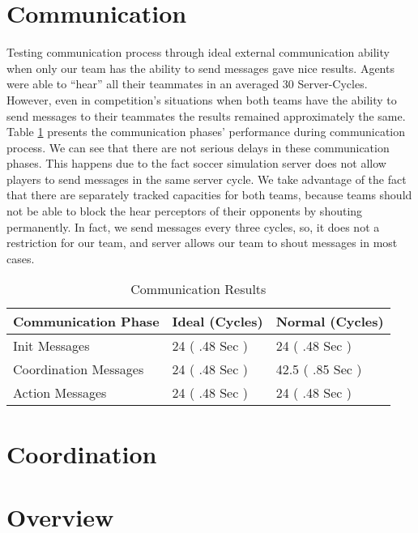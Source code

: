 \section{Communication}
Testing communication process through ideal external communication ability when only our team has the ability to send messages gave nice results. Agents were able to ``hear'' all their teammates in an averaged 30 Server-Cycles. However, even in competition's situations when both teams have the ability to send messages to their teammates the results remained approximately the same. Table \ref{CommunicationResults} presents the communication phases' performance during communication process. We can see that there are not serious delays in these communication phases. This happens due to the fact soccer simulation server does not allow players to send messages in the same server cycle. We take advantage of the fact that there are separately tracked capacities for both teams, because teams should not be able to block the hear perceptors of their opponents by shouting permanently. In fact, we send  messages every three cycles, so, it does not a restriction for our team, and server allows our team to shout messages in most cases.

\begin{table}
\begin{center}
    \begin{tabular}{ | l | l | l |}
    \hline
    \textbf{Communication Phase} 	& Ideal (Cycles) & Normal (Cycles) \\ \hline
    Init Messages 			& 24  ( .48 Sec ) 			& 24 	( .48 Sec )		 \\ \hline	
    Coordination Messages			& 24  ( .48 Sec )			& 42.5  ( .85 Sec )			 \\ \hline
    Action Messages 		& 24  ( .48 Sec )			& 24 ( .48 Sec )	 		 \\ 
    \hline
    \end{tabular}
\end{center}
\label{CommunicationResults}
\caption{Communication Results}
\end{table}

\section{Coordination}

\section{Overview}

